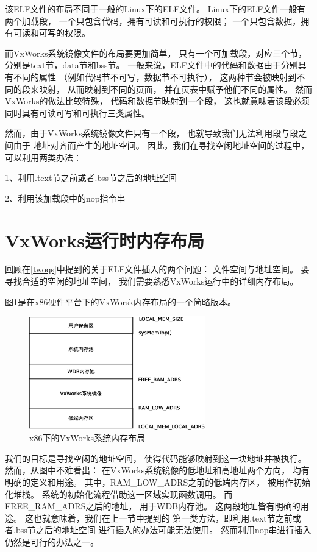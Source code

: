 该ELF文件的布局不同于一般的Linux下的ELF文件。
Linux下的ELF文件一般有两个加载段，
一个只包含代码，拥有可读和可执行的权限；
一个只包含数据，拥有可读和可写的权限。

而VxWorks系统镜像文件的布局要更加简单，
只有一个可加载段，对应三个节，
分别是text节，data节和bss节。
一般来说，ELF文件中的代码和数据由于分别具有不同的属性
（例如代码节不可写，数据节不可执行），
这两种节会被映射到不同的段来映射，
从而映射到不同的页面，
并在页表中赋予他们不同的属性。
然而VxWorks的做法比较特殊，
代码和数据节映射到一个段，
这也就意味着该段必须同时具有可读可写和可执行三类属性。

然而，由于VxWorks系统镜像文件只有一个段，
也就导致我们无法利用段与段之间由于
地址对齐而产生的地址空间。
因此，我们在寻找空闲地址空间的过程中，
可以利用两类办法：

1、利用.text节之前或者.bss节之后的地址空间

2、利用该加载段中的nop指令串




\section{VxWorks运行时内存布局}
\label{neicunbuju}

回顾在\ref{twoqs}中提到的关于ELF文件插入的两个问题：
文件空间与地址空间。
要寻找合适的空闲的地址空间，
我们需要熟悉VxWorks运行中的详细内存布局。

图\ref{ram}是在x86硬件平台下的VxWorsk内存布局的一个简略版本。

\begin{figure}[h!]
    \centering
    \includegraphics[width=0.68\textwidth]{figure/ram.eps}
    \caption{x86下的VxWorks系统内存布局}
    \label{ram}
\end{figure}

我们的目标是寻找空闲的地址空间，
使得代码能够映射到这一块地址并被执行。
然而，从图中不难看出：
在VxWorks系统镜像的低地址和高地址两个方向，
均有明确的定义和用途。
其中，RAM\_LOW\_ADRS之前的低端内存区，
被用作初始化堆栈。
系统的初始化流程借助这一区域实现函数调用。
而FREE\_RAM\_ADRS之后的地址，
用于WDB内存池。
这两段地址皆有明确的用途。
这也就意味着，我们在上一节中提到的
第一类方法，即利用.text节之前或者.bss节之后的地址空间
进行插入的办法可能无法使用。
然而利用nop串进行插入仍然是可行的办法之一。


